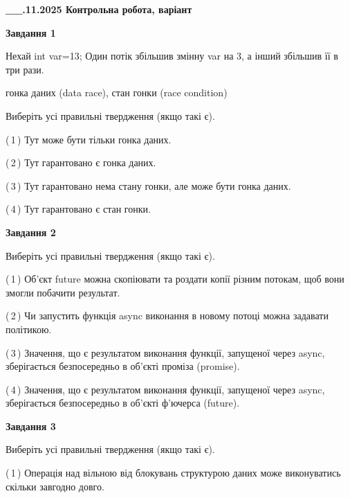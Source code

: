 \documentclass[12pt, ukrainian]{article}
\begin{document}
\begin {large}

\textbf{\_\_.11.2025 Контрольна робота, варіант  }\par


{

\begin{center}
\textbf{Завдання 1}
\end{center}
Нехай int var=13; Один потік збільшив змінну var на 3, а інший збільшив її в три рази.

гонка даних (data race), стан гонки (race condition)

Виберіть усі правильні твердження (якщо такі є).\par
\vspace{2mm}
(\,1\,) Тут може бути тільки гонка даних.%

(\,2\,) Тут гарантовано є гонка даних.%

(\,3\,) Тут гарантовано нема стану гонки, але може бути гонка даних.%

(\,4\,) Тут гарантовано є стан гонки.%



\begin{center}
\textbf{Завдання 2}
\end{center}
Виберіть усі правильні твердження (якщо такі є).\par
\vspace{2mm}

(\,1\,) Об’єкт future можна скопіювати та роздати копії різним потокам, щоб вони змогли побачити результат.%

(\,2\,) Чи запустить функція  async виконання в новому потоці можна задавати політикою.%

(\,3\,) Значення, що є результатом виконання функції, запущеної через async, зберігається безпосередньо в об’єкті проміза (promise).%

(\,4\,) Значення, що є результатом виконання функції, запущеної через async, зберігається безпосередньо в об’єкті ф’ючерса (future).%



\begin{center}
\textbf{Завдання 3}
\end{center}
Виберіть усі правильні твердження (якщо такі є).\par
\vspace{2mm}

(\,1\,) Операція над вільною від блокувань структурою даних може виконуватись скільки завгодно довго.%

}
\end{large}
\end{document}
